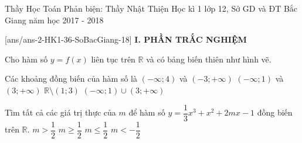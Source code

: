 
			\begin{name}
		{Thầy Học Toán Phản biện: Thầy Nhật Thiện}
		{Học kì 1 lớp 12, Sở GD và ĐT Bắc Giang năm học 2017 - 2018}
	\end{name}
	\setcounter{ex}{0}\setcounter{bt}{0}
	[ans/ans-2-HK1-36-SoBacGiang-18]
\noindent\textbf{I. PHẦN TRẮC NGHIỆM}

\begin{ex}%
Cho hàm số $y=f(x)$ liên tục trên $\mathbb{R}$ và có bảng biến thiên như hình vẽ.
\begin{center}
\end{center}
 Các khoảng đồng biến của hàm số là 
\choice
{$(-\infty;4)$ và $(-3;+\infty)$}
{\True $(-\infty;1)$ và $(3;+\infty)$}
{$\mathbb{R}\setminus (1;3)$}
{$(-\infty;1)\cup (3;+\infty)$}
\end{ex}

\begin{ex}%
Tìm tất cả các giá trị thực của $m$ để hàm số $y=\dfrac{1}{3}x^3+x^2+2mx-1$ đồng biến trên $\mathbb{R}$.
\choice
{$m>\dfrac{1}{2}$}
{\True $m\geq \dfrac{1}{2}$}
{$m\leq \dfrac{1}{2}$}
{$m<-\dfrac{1}{2}$}
\end{ex}


